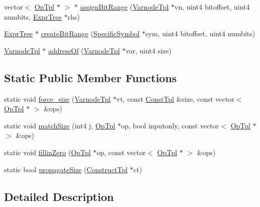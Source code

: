\begin{DoxyCompactItemize}
\item 
vector$<$ \mbox{\hyperlink{class_op_tpl}{Op\+Tpl}} $\ast$ $>$ $\ast$ \mbox{\hyperlink{class_pcode_compile_a2ba1215fdd8b357164b6271282f1f808}{assign\+Bit\+Range}} (\mbox{\hyperlink{class_varnode_tpl}{Varnode\+Tpl}} $\ast$vn, uint4 bitoffset, uint4 numbits, \mbox{\hyperlink{class_expr_tree}{Expr\+Tree}} $\ast$rhs)
\item 
\mbox{\hyperlink{class_expr_tree}{Expr\+Tree}} $\ast$ \mbox{\hyperlink{class_pcode_compile_a0f46346dc8f300f3ae8fe0b0f7b65e79}{create\+Bit\+Range}} (\mbox{\hyperlink{class_specific_symbol}{Specific\+Symbol}} $\ast$sym, uint4 bitoffset, uint4 numbits)
\item 
\mbox{\hyperlink{class_varnode_tpl}{Varnode\+Tpl}} $\ast$ \mbox{\hyperlink{class_pcode_compile_a31003fa38370385ed889845d9616ba15}{address\+Of}} (\mbox{\hyperlink{class_varnode_tpl}{Varnode\+Tpl}} $\ast$var, uint4 size)
\end{DoxyCompactItemize}
\subsection*{Static Public Member Functions}
\begin{DoxyCompactItemize}
\item 
static void \mbox{\hyperlink{class_pcode_compile_a620eb9c557b3c38ff57f958211065938}{force\+\_\+size}} (\mbox{\hyperlink{class_varnode_tpl}{Varnode\+Tpl}} $\ast$vt, const \mbox{\hyperlink{class_const_tpl}{Const\+Tpl}} \&size, const vector$<$ \mbox{\hyperlink{class_op_tpl}{Op\+Tpl}} $\ast$ $>$ \&ops)
\item 
static void \mbox{\hyperlink{class_pcode_compile_afe5eba410aa5edfb8ba083cc3f31da2b}{match\+Size}} (int4 j, \mbox{\hyperlink{class_op_tpl}{Op\+Tpl}} $\ast$op, bool inputonly, const vector$<$ \mbox{\hyperlink{class_op_tpl}{Op\+Tpl}} $\ast$ $>$ \&ops)
\item 
static void \mbox{\hyperlink{class_pcode_compile_a7844bb12a59ed9998354ed9328e18f90}{fillin\+Zero}} (\mbox{\hyperlink{class_op_tpl}{Op\+Tpl}} $\ast$op, const vector$<$ \mbox{\hyperlink{class_op_tpl}{Op\+Tpl}} $\ast$ $>$ \&ops)
\item 
static bool \mbox{\hyperlink{class_pcode_compile_a107dd115ba53b9158a0c76b6a2368c52}{propagate\+Size}} (\mbox{\hyperlink{class_construct_tpl}{Construct\+Tpl}} $\ast$ct)
\end{DoxyCompactItemize}


\subsection{Detailed Description}


